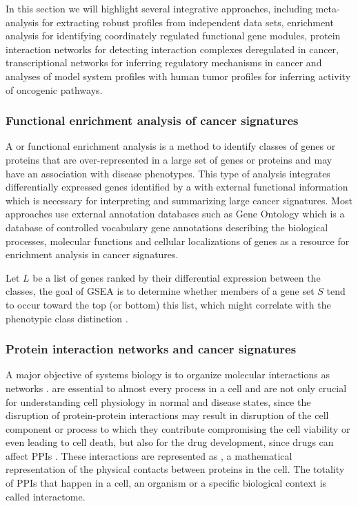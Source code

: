 In this section we will highlight several integrative  approaches, including meta-analysis for extracting robust profiles from independent data sets, enrichment analysis for identifying coordinately regulated functional gene modules, protein interaction networks for detecting interaction complexes deregulated in cancer, transcriptional networks for inferring regulatory mechanisms in cancer and analyses of model system profiles with human tumor profiles for inferring activity of oncogenic pathways.

\subsubsection{Functional enrichment analysis of cancer signatures}

A  or functional enrichment analysis is a method to identify classes of genes or proteins that are over-represented in a large set of genes or proteins and may have an association with disease phenotypes.
This type of analysis integrates  differentially expressed genes identified by a    with external functional information which is necessary for interpreting and summarizing large cancer signatures.
Most approaches use external annotation databases such as Gene Ontology which is a database of controlled vocabulary gene annotations describing the biological processes, molecular functions and cellular localizations of genes as a resource for enrichment analysis in cancer signatures.

Let $L$ be a  list of genes ranked by their differential expression between the classes, the goal of GSEA is to determine whether members of a gene set $S$ tend to occur toward the top (or bottom) this list,  which might correlate with the phenotypic class distinction \cite{subramanian2005gene}.

\subsubsection{Protein interaction networks and cancer signatures}

A major objective of systems biology is to organize molecular interactions as networks \cite{vinayagam2014integrating}.  are essential to almost every process in a cell and are not only crucial for understanding cell physiology in normal and disease states, since the disruption of protein-protein interactions may result in disruption of the cell component or process to which they contribute compromising the cell viability or even leading to cell death, but also for the drug development, since drugs can affect PPIs \cite{PPIs,alzate2009neuroproteomics}.
These interactions are represented as , a mathematical representation of the physical contacts between proteins in the cell.
The totality of PPIs that happen in a cell, an organism or a specific biological context is called interactome.

